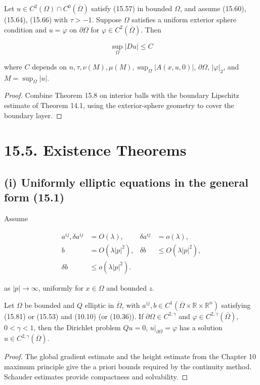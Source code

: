 \begin{theorem}\label{gilbarg-trudinger.thm.15.9.divergence-global-bound}
Let $u\in C^2(\Omega)\cap C^0(\overline\Omega)$ satisfy (15.57) in bounded
$\Omega$, and assume (15.60), (15.64), (15.66) with $\tau>-1$. Suppose $\Omega$
satisfies a uniform exterior sphere condition and $u=\varphi$ on $\partial\Omega$ for
$\varphi\in C^2(\overline\Omega)$. Then

\[
\tag{15.80}
\sup_{\Omega} |Du| \leq C
\]

where $C$ depends on $n,\tau,\nu(M),\mu(M),\sup_\Omega|A(x,u,0)|$,
$\partial\Omega$, $|\varphi|_2$, and $M=\sup_\Omega|u|$.
\end{theorem}
\begin{proof}
\sketch Combine Theorem 15.8 on interior balls with the boundary Lipschitz estimate
of Theorem 14.1, using the exterior-sphere geometry to cover the boundary layer.
\end{proof}

\medskip

\section*{15.5. Existence Theorems}

\subsection*{(i) Uniformly elliptic equations in the general form (15.1)}
Assume

\begin{equation}\tag{15.81}
\begin{aligned}
a^{ij},\delta a^{ij}&=O(\lambda),&
\delta a^{ij}&=o(\lambda),\\
b&=O(\lambda|p|^2),&
\delta b&\le O(\lambda|p|^2),\\
\delta b&\le o(\lambda|p|^2).
\end{aligned}
\end{equation}

as \(|p|\to\infty\), uniformly for \(x\in\Omega\) and bounded \(z\).

\begin{theorem}\label{gilbarg-trudinger.thm.15.10.uniformly-elliptic-existence}
Let $\Omega$ be bounded and $Q$ elliptic in $\overline\Omega$, with
$a^{ij},b\in C^1(\overline\Omega\times\mathbb R\times\mathbb R^n)$ satisfying
(15.81) or (15.53) and (10.10) (or (10.36)). If
$\partial\Omega\in C^{2,\gamma}$ and $\varphi\in C^{2,\gamma}(\overline\Omega)$,
$0<\gamma<1$, then the Dirichlet problem $Qu=0$, $u|_{\partial\Omega}=\varphi$
has a solution $u\in C^{2,\gamma}(\overline\Omega)$.
\end{theorem}
\begin{proof}
\sketch The global gradient estimate and the height estimate from the Chapter 10
maximum principle give the a priori bounds required by the continuity method.
Schauder estimates provide compactness and solvability.
\end{proof}

